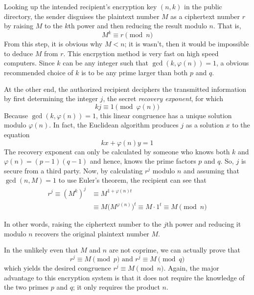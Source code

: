 \documentclass{article}
\theoremstyle{remark}
\theoremstyle{definition}
\begin{document}
Looking up the intended recipient's encryption key $(n, k)$ in the public directory, the sender disguises the plaintext number $M$ as a ciphertext number $r$ by raising $M$ to the $k$th power and then reducing the result modulo $n$. That is, 
\[M^k \equiv r \pmod{n}\]
From this step, it is obvious why $M<n$; it is wasn't, then it would be impossible to deduce $M$ from $r$. This encrpytion method is very fast on high speed computers. Since $k$ can be any integer such that $\gcd(k, \varphi(n)) = 1$, a obvious recommended choice of $k$ is to be any prime larger than both $p$ and $q$. 

At the other end, the authorized recipient deciphers the transmitted information by first determining the integer $j$, the secret \textit{recovery exponent}, for which 
\[k j \equiv 1 \pmod{\varphi(n)}\]
Because $\gcd(k, \varphi(n)) = 1$, this linear congruence has a unique solution modulo $\varphi(n)$. In fact, the Euclidean algorithm produces $j$ as a solution $x$ to the equation 
\[kx + \varphi(n) y = 1\]
The recovery exponent can only be calculated by someone who knows both $k$ and $\varphi(n) = (p-1) (q-1)$ and hence, knows the prime factors $p$ and $q$. So, $j$ is secure from a third party. Now, by calculating $r^j$ modulo $n$ and assuming that $\gcd(n, M) = 1$ to use Euler's theorem, the recipient can see that 
\begin{align*}
    r^j \equiv (M^k)^j & \equiv M^{1 + \varphi(n) t} \\
    & \equiv M \big( M^{\varphi(n)} \big)^t \equiv M \cdot 1^t \equiv M \pmod{n}
\end{align*}

In other words, raising the ciphertext number to the $j$th power and reducing it modulo $n$ recovers the original plaintext number $M$. 

In the unlikely even that $M$ and $n$ are not coprime, we can actually prove that
\[r^j \equiv M \pmod{p} \text{ and } r^j \equiv M \pmod{q}\]
which yields the desired congruence $r^j \equiv M \pmod{n}$. Again, the major advantage to this encryption system is that it does not require the knowledge of the two primes $p$ and $q$; it only requires the product $n$. 
\end{document}
